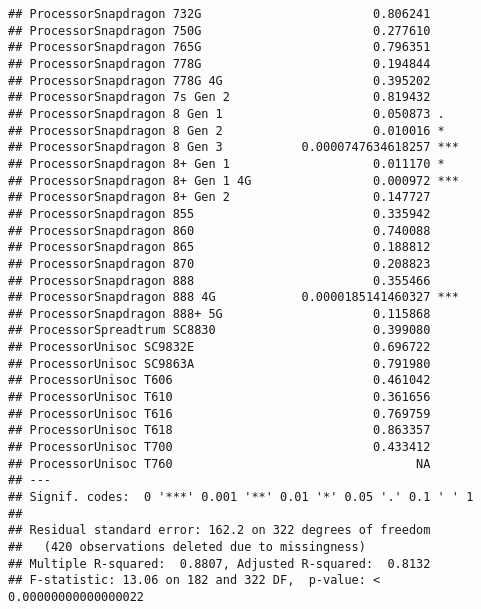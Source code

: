 \documentclass[
]{article}
\begin{document}
\begin{verbatim}
## ProcessorSnapdragon 732G                        0.806241    
## ProcessorSnapdragon 750G                        0.277610    
## ProcessorSnapdragon 765G                        0.796351    
## ProcessorSnapdragon 778G                        0.194844    
## ProcessorSnapdragon 778G 4G                     0.395202    
## ProcessorSnapdragon 7s Gen 2                    0.819432    
## ProcessorSnapdragon 8 Gen 1                     0.050873 .  
## ProcessorSnapdragon 8 Gen 2                     0.010016 *  
## ProcessorSnapdragon 8 Gen 3           0.0000747634618257 ***
## ProcessorSnapdragon 8+ Gen 1                    0.011170 *  
## ProcessorSnapdragon 8+ Gen 1 4G                 0.000972 ***
## ProcessorSnapdragon 8+ Gen 2                    0.147727    
## ProcessorSnapdragon 855                         0.335942    
## ProcessorSnapdragon 860                         0.740088    
## ProcessorSnapdragon 865                         0.188812    
## ProcessorSnapdragon 870                         0.208823    
## ProcessorSnapdragon 888                         0.355466    
## ProcessorSnapdragon 888 4G            0.0000185141460327 ***
## ProcessorSnapdragon 888+ 5G                     0.115868    
## ProcessorSpreadtrum SC8830                      0.399080    
## ProcessorUnisoc SC9832E                         0.696722    
## ProcessorUnisoc SC9863A                         0.791980    
## ProcessorUnisoc T606                            0.461042    
## ProcessorUnisoc T610                            0.361656    
## ProcessorUnisoc T616                            0.769759    
## ProcessorUnisoc T618                            0.863357    
## ProcessorUnisoc T700                            0.433412    
## ProcessorUnisoc T760                                  NA    
## ---
## Signif. codes:  0 '***' 0.001 '**' 0.01 '*' 0.05 '.' 0.1 ' ' 1
## 
## Residual standard error: 162.2 on 322 degrees of freedom
##   (420 observations deleted due to missingness)
## Multiple R-squared:  0.8807, Adjusted R-squared:  0.8132 
## F-statistic: 13.06 on 182 and 322 DF,  p-value: < 0.00000000000000022
\end{verbatim}
\end{document}
